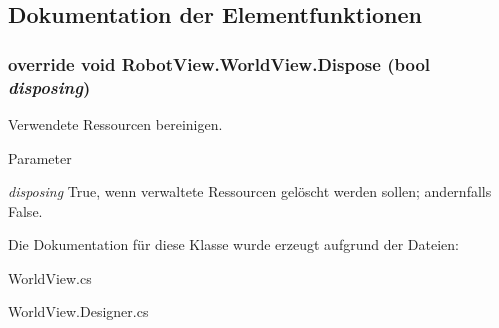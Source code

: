 \subsection{Dokumentation der Elementfunktionen}
\hypertarget{class_robot_view_1_1_world_view_ae412a0d88561b075a22955c6e0b41aca}{
\subsubsection[{Dispose}]{\setlength{\rightskip}{0pt plus 5cm}override void RobotView.WorldView.Dispose (bool {\em disposing})}}
\label{class_robot_view_1_1_world_view_ae412a0d88561b075a22955c6e0b41aca}


Verwendete Ressourcen bereinigen. 


\begin{DoxyParams}{Parameter}
\item[{\em disposing}]True, wenn verwaltete Ressourcen gelöscht werden sollen; andernfalls False.\end{DoxyParams}


Die Dokumentation für diese Klasse wurde erzeugt aufgrund der Dateien:\begin{DoxyCompactItemize}
\item 
WorldView.cs\item 
WorldView.Designer.cs\end{DoxyCompactItemize}

